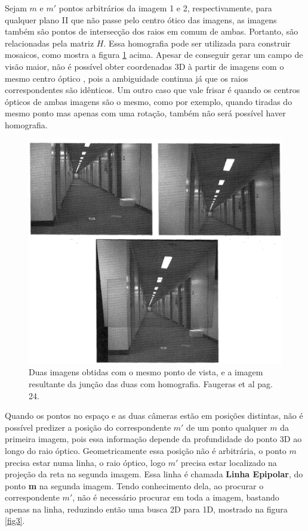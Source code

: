  Sejam $m$ e $m'$ pontos arbitrários da imagem 1 e 2, respectivamente, para qualquer plano II que não passe pelo centro ótico das imagens, as imagens também são pontos de intersecção dos raios em comum de ambas. Portanto, são relacionadas pela matriz $H$. Essa homografia pode ser utilizada para construir mosaicos, como mostra a figura \ref{fig2} acima. Apesar de conseguir gerar um campo de visão maior, não é possível obter coordenadas 3D à partir de imagens com o mesmo centro óptico \cite{Faugeras-Geometry}, pois a ambiguidade continua já que os raios correspondentes são idênticos. Um outro caso que vale frisar é quando os centros ópticos de ambas imagens são o mesmo, como por exemplo, quando tiradas do mesmo ponto mas apenas com uma rotação, também não será possível haver homografia.

\begin{figure}
	\centering
		\includegraphics[width=1.0\textwidth]{Imagens/figura2-2.png}
	\caption{Duas imagens obtidas com o mesmo ponto de vista, e a imagem resultante da junção das duas com homografia. Faugeras et al \cite{Faugeras-Geometry} pag. 24.}
	\label{fig2}
\end{figure}

Quando os pontos no espaço e as duas câmeras estão em posições distintas, não é possível predizer a posição do correspondente $m'$ de um ponto qualquer $m$ da primeira imagem, pois essa informação depende da profundidade do ponto 3D ao longo do raio óptico. Geometricamente essa posição não é arbitrária, o ponto $m$ precisa estar numa linha, o raio óptico, logo $m'$ precisa estar localizado na projeção da reta na segunda imagem. Essa linha é chamada \textbf{Linha Epipolar}, do ponto \textbf{m} na segunda imagem. Tendo conhecimento dela, ao procurar o correspondente $m'$, não é necessário procurar em toda a imagem, bastando apenas na linha, reduzindo então uma busca 2D para 1D, mostrado na figura \ref{fig3}.

